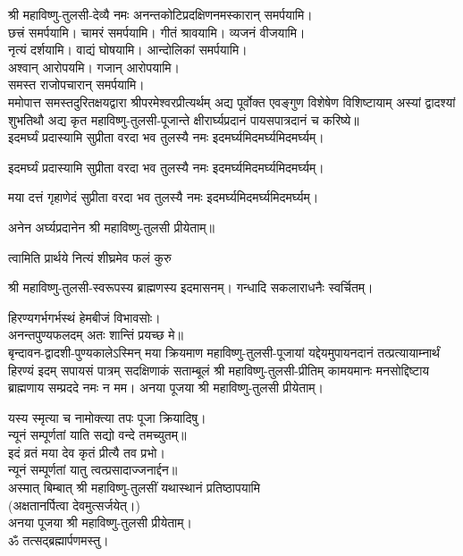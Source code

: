 श्री महाविष्णु-तुलसी-देव्यै नमः अनन्तकोटिप्रदक्षिणनमस्कारान् समर्पयामि।\\
छत्त्रं समर्पयामि। चामरं समर्पयामि। गीतं श्रावयामि। व्यजनं वीजयामि।\\
नृत्यं दर्शयामि। वाद्यं घोषयामि। आन्दोलिकां समर्पयामि।\\
अश्वान् आरोपयमि। गजान् आरोपयामि।\\
समस्त राजोपचारान् समर्पयामि।\\


ममोपात्त समस्तदुरितक्षयद्वारा श्रीपरमेश्वरप्रीत्यर्थम् अद्य पूर्वोक्त एवङ्गुण विशेषेण विशिष्टायाम् अस्यां द्वादश्यां शुभतिथौ अद्य कृत महाविष्णु-तुलसी-पूजान्ते क्षीरार्घ्यप्रदानं पायसपात्रदानं च करिष्ये॥\\

{इदमर्घ्यं प्रदास्यामि सुप्रीता वरदा भव}
\hfill तुलस्यै नमः इदमर्घ्यमिदमर्घ्यमिदमर्घ्यम्।

{इदमर्घ्यं प्रदास्यामि सुप्रीता वरदा भव}
\hfill तुलस्यै नमः इदमर्घ्यमिदमर्घ्यमिदमर्घ्यम्।

{मया दत्तं गृहाणेदं सुप्रीता वरदा भव}
\hfill तुलस्यै नमः इदमर्घ्यमिदमर्घ्यमिदमर्घ्यम्।

अनेन अर्घ्यप्रदानेन श्री महाविष्णु-तुलसी प्रीयेताम्॥\\


{त्वामिति प्रार्थये नित्यं शीघ्रमेव फलं कुरु}

श्री महाविष्णु-तुलसी-स्वरूपस्य ब्राह्मणस्य इदमासनम्। गन्धादि सकलाराधनैः स्वर्चितम्।

हिरण्यगर्भगर्भस्थं हेमबीजं विभावसोः।\\
अनन्तपुण्यफलदम् अतः शान्तिं प्रयच्छ मे॥\\

बृन्दावन-द्वादशी-पुण्यकालेऽस्मिन् मया क्रियमाण महाविष्णु-तुलसी-पूजायां यद्देयमुपायनदानं तत्प्रत्यायाम्नार्थं
हिरण्यं इदम् सपायसं पात्रम् सदक्षिणाकं सताम्बूलं श्री महाविष्णु-तुलसी-प्रीतिम्
कामयमानः मनसोद्दिष्टाय ब्राह्मणाय सम्प्रददे नमः न मम।
अनया पूजया श्री महाविष्णु-तुलसी प्रीयेताम्।

यस्य स्मृत्या च नामोक्त्या तपः पूजा क्रियादिषु।\\
न्यूनं सम्पूर्णतां याति सद्यो वन्दे तमच्युतम्॥ \\
इदं व्रतं मया देव कृतं प्रीत्यै तव प्रभो।\\
न्यूनं सम्पूर्णतां यातु त्वत्प्रसादाज्जनार्द्दन॥\\

अस्मात् बिम्बात् श्री महाविष्णु-तुलसीं यथास्थानं प्रतिष्ठापयामि\\
(अक्षतानर्पित्वा देवमुत्सर्जयेत्।)\\
अनया पूजया श्री महाविष्णु-तुलसी प्रीयेताम्। \\
ॐ तत्सद्ब्रह्मार्पणमस्तु।